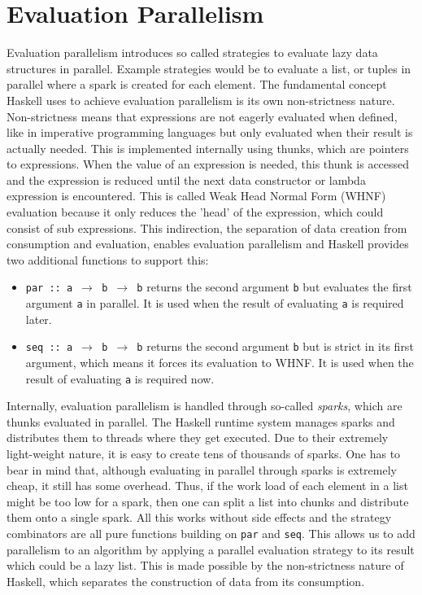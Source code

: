 \section{Evaluation Parallelism}
Evaluation parallelism introduces so called strategies to evaluate lazy data structures in parallel. Example strategies would be to evaluate a list, or tuples in parallel where a spark is created for each element. The fundamental concept Haskell uses to achieve evaluation parallelism is its own non-strictness nature. Non-strictness means that expressions are not eagerly evaluated when defined, like in imperative programming languages but only evaluated when their result is actually needed. This is implemented internally using thunks, which are pointers to expressions. When the value of an expression is needed, this thunk is accessed and the expression is reduced until the next data constructor or lambda expression is encountered. This is called Weak Head Normal Form (WHNF) evaluation because it only reduces the 'head' of the expression, which could consist of sub expressions. This indirection, the separation of data creation from consumption and evaluation, enables evaluation parallelism and Haskell provides two additional functions to support this:

\begin{itemize}
	\item \texttt{par :: a $\rightarrow$ b $\rightarrow$ b} returns the second argument \texttt{b} but evaluates the first argument \texttt{a} in parallel. It is used when the result of evaluating \texttt{a} is required later.
	
	\item \texttt{seq :: a $\rightarrow$ b $\rightarrow$ b} returns the second argument \texttt{b} but is strict in its first argument, which means it forces its evaluation to WHNF. It is used when the result of evaluating \texttt{a} is required now.
\end{itemize}

Internally, evaluation parallelism is handled through so-called \textit{sparks}, which are thunks evaluated in parallel. The Haskell runtime system manages sparks and distributes them to threads where they get executed. Due to their extremely light-weight nature, it is easy to create tens of thousands of sparks. One has to bear in mind that, although evaluating in parallel through sparks is extremely cheap, it still has some overhead. Thus, if the work load of each element in a list might be too low for a spark, then one can split a list into chunks and distribute them onto a single spark.
All this works without side effects and the strategy combinators are all pure functions building on \texttt{par} and \texttt{seq}. This allows us to add parallelism to an algorithm by applying a parallel evaluation strategy to its result which could be a lazy list. This is made possible by the non-strictness nature of Haskell, which separates the construction of data from its consumption.


